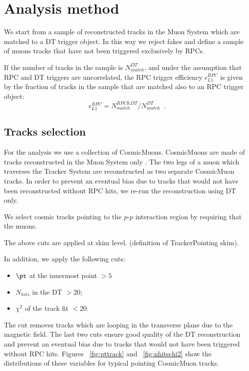 \section{Analysis method}
We start from a sample of reconstructed tracks 
in the Muon System which are matched to a DT 
trigger object. In this way we reject fakes 
and define a sample of muons tracks that have not been 
triggered exclusively by RPCs.

If the number of tracks in the sample is 
$N_{match}^{DT}$, and under the assumption
that RPC and DT triggers are uncorrelated,
the RPC trigger efficiency 
$\epsilon_{L1}^{RPC}$ is given by the fraction 
of tracks in the sample that are matched also 
to an RPC trigger object:
\begin{equation}
\epsilon_{L1}^{RPC} = N_{match}^{RPC\&DT}/N_{match}^{DT} \,\,\,.
\end{equation}

\subsection{Tracks selection}
For the analysis we use a collection of CosmicMuons.
CosmicMuons are made of tracks reconstructed in the
Muon System only .
The two legs of a muon which traverses
the Tracker System are reconstructed as two separate 
CosmicMuon tracks.
In order to prevent an eventual bias due to tracks 
that would not have been reconstructed without
RPC hits, we re-run the reconstruction using DT only.

We select cosmic tracks pointing to the $p$-$p$ interaction
region by requiring that the muons.
 
The above cuts are applied at skim level.
(definition of TrackerPointing skim).

In addition, we apply the following 
cuts:
\begin{itemize}
\item
$\pt$ at the innermost point $ > 5$\GeVc 
\item
$N_{hits}$ in the DT $ > 20 $;
\item
$\chi^2$ of the track fit $ < 20 $.
\end{itemize}
The \pt cut removes tracks which are
looping in the transverse plane due 
to the magnetic field. The last two cuts 
ensure good quality of the DT reconstruction 
and prevent an eventual bias due to 
tracks that would not have been triggered 
without RPC hits.
Figures ~\ref{fig:pttrack} and ~\ref{fig:nhitschi2} show 
the distributions of these variables for typical pointing
CosmicMuon tracks.

